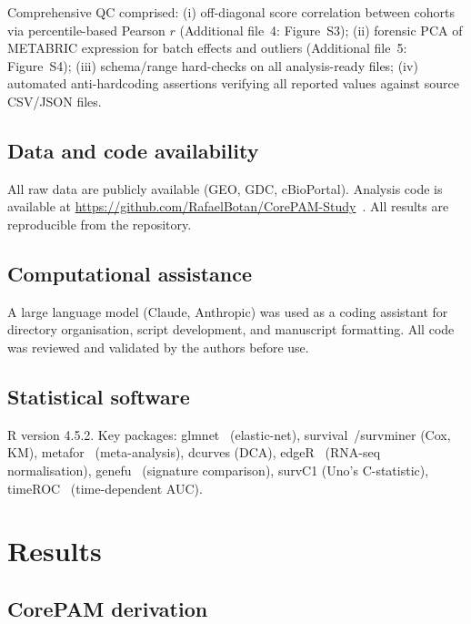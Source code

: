 \documentclass[pdflatex,sn-vancouver-num]{sn-jnl}
\begin{document}
Comprehensive QC comprised: (i) off-diagonal score correlation between cohorts via percentile-based Pearson $r$ (Additional file~4: Figure~S3); (ii) forensic PCA of METABRIC expression for batch effects and outliers (Additional file~5: Figure~S4); (iii) schema/range hard-checks on all analysis-ready files; (iv) automated anti-hardcoding assertions verifying all reported values against source CSV/JSON files.

\subsection{Data and code availability}\label{subsec:data-code}

All raw data are publicly available (GEO, GDC, cBioPortal). Analysis code is available at \url{https://github.com/RafaelBotan/CorePAM-Study}~\cite{botan2026}. All results are reproducible from the repository.

\subsection{Computational assistance}\label{subsec:computational-assistance}

A large language model (Claude, Anthropic) was used as a coding assistant for directory organisation, script development, and manuscript formatting. All code was reviewed and validated by the authors before use.

\subsection{Statistical software}\label{subsec:statistical-software}

R version 4.5.2. Key packages: glmnet~\cite{friedman2010} (elastic-net), survival~\cite{therneau2000}/survminer (Cox, KM), metafor~\cite{viechtbauer2010} (meta-analysis), dcurves (DCA), edgeR~\cite{robinson2010} (RNA-seq normalisation), genefu~\cite{gendoo2016} (signature comparison), survC1 (Uno's C-statistic), timeROC~\cite{blanche2013} (time-dependent AUC).

\section{Results}\label{sec:results}

\subsection{CorePAM derivation}\label{subsec:results-derivation}
\end{document}

